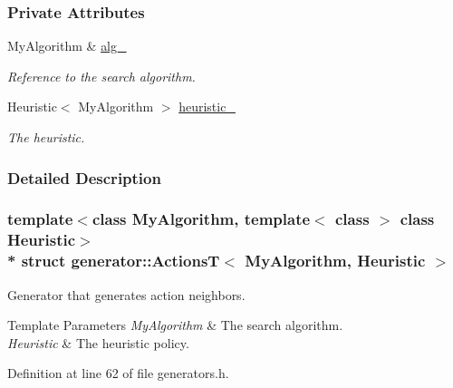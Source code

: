 \subsubsection*{Private Attributes}
\begin{DoxyCompactItemize}
\item 
My\+Algorithm \& \hyperlink{structgenerator_1_1ActionsT_ae911ab6d018dbea9c1f57fccd9f5c954}{alg\+\_\+}\hypertarget{structgenerator_1_1ActionsT_ae911ab6d018dbea9c1f57fccd9f5c954}{}\label{structgenerator_1_1ActionsT_ae911ab6d018dbea9c1f57fccd9f5c954}

\begin{DoxyCompactList}\small\item\em Reference to the search algorithm. \end{DoxyCompactList}\item 
Heuristic$<$ My\+Algorithm $>$ \hyperlink{structgenerator_1_1ActionsT_aa6aee0841e32bbc28f7f042976701ec1}{heuristic\+\_\+}\hypertarget{structgenerator_1_1ActionsT_aa6aee0841e32bbc28f7f042976701ec1}{}\label{structgenerator_1_1ActionsT_aa6aee0841e32bbc28f7f042976701ec1}

\begin{DoxyCompactList}\small\item\em The heuristic. \end{DoxyCompactList}\end{DoxyCompactItemize}


\subsubsection{Detailed Description}
\subsubsection*{template$<$class My\+Algorithm, template$<$ class $>$ class Heuristic$>$\\*
struct generator\+::\+Actions\+T$<$ My\+Algorithm, Heuristic $>$}

Generator that generates action neighbors. 


\begin{DoxyTemplParams}{Template Parameters}
{\em My\+Algorithm} & The search algorithm. \\
\hline
{\em Heuristic} & The heuristic policy. \\
\hline
\end{DoxyTemplParams}


Definition at line 62 of file generators.\+h.



